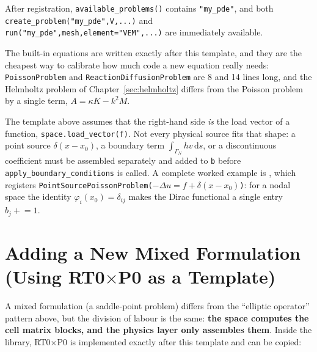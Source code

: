 \documentclass[11pt,oneside]{book}
\theoremstyle{definition}
\theoremstyle{plain}
\newenvironment{caution}{%
  \begin{tcolorbox}[colback=orange!5,colframe=orange!55,title=Caution,fonttitle=\bfseries]%
}{%
  \end{tcolorbox}%
}
\newcommand{\code}[1]{\texttt{#1}}
\newcommand{\dif}{\,\mathrm{d}}
\begin{document}
After registration, \code{available\_\allowbreak problems()} contains \code{"my\_\allowbreak pde"}, and both
\code{create\_\allowbreak problem("my\_\allowbreak pde",\allowbreak  V,\allowbreak  ...)} and
\code{run("my\_\allowbreak pde",\allowbreak  mesh,\allowbreak  element="VEM",\allowbreak  ...)} are immediately available.

The built-in equations are written exactly after this template, and they are the
cheapest way to calibrate how much code a new equation really needs:
\code{PoissonProblem} and \code{ReactionDiffusionProblem} are 8 and 14 lines long,
and the Helmholtz problem of Chapter~\ref{sec:helmholtz} differs from the Poisson
problem by a single term, $A=\kappa K-k^2M$.

\begin{caution}
The template above assumes that the right-hand side \emph{is} the load vector of a
function, \code{space.load\_\allowbreak vector(f)}. Not every physical source fits that shape: a
point source $\delta(x-x_0)$, a boundary term $\int_{\Gamma_N}hv\dif s$, or a
discontinuous coefficient must be assembled separately and added to \code{b} before
\code{apply\_\allowbreak boundary\_\allowbreak conditions} is called. A complete worked example is
, which registers
\code{PointSourcePoissonProblem($-\Delta u=f+\delta(x-x_0)$)}: for a nodal space the
identity $\varphi_i(x_0)=\delta_{ij}$ makes the Dirac functional a single entry
$b_j\mathrel{+}=1$.
\end{caution}

\section[Adding a New Mixed Formulation (RT0\texorpdfstring{$\times$}{x}P0 Template)]{Adding a New Mixed Formulation (Using RT0\texorpdfstring{$\times$}{x}P0 as a Template)}

A mixed formulation (a saddle-point problem) differs from the ``elliptic operator''
pattern above, but the division of labour is the same: \textbf{the space computes the
cell matrix blocks, and the physics layer only assembles them}. Inside the library,
RT0$\times$P0 is implemented exactly after this template and can be copied:
\end{document}
